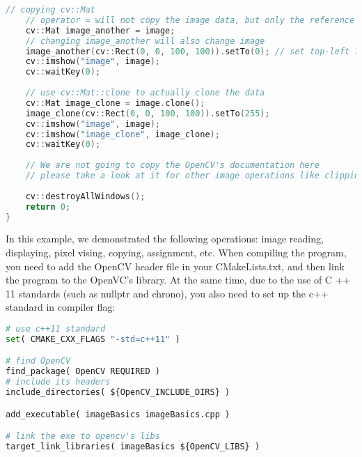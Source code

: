 \begin{lstlisting}[language=C++,caption=slambook/ch5/imageBasics/imageBasics.cpp]
    // copying cv::Mat
    // operator = will not copy the image data, but only the reference
    cv::Mat image_another = image;
    // changing image_another will also change image 
    image_another(cv::Rect(0, 0, 100, 100)).setTo(0); // set top-left 100*100 block to zero
    cv::imshow("image", image);
    cv::waitKey(0);
    
    // use cv::Mat::clone to actually clone the data
    cv::Mat image_clone = image.clone();
    image_clone(cv::Rect(0, 0, 100, 100)).setTo(255);
    cv::imshow("image", image);
    cv::imshow("image_clone", image_clone);
    cv::waitKey(0);
    
    // We are not going to copy the OpenCV's documentation here
    // please take a look at it for other image operations like clipping, rotating and scaling.
    
    cv::destroyAllWindows();
    return 0;
}
\end{lstlisting}

In this example, we demonstrated the following operations: image reading, displaying, pixel vising, copying, assignment, etc. When compiling the program, you need to add the OpenCV header file in your CMakeLists.txt, and then link the program to the OpenVC's library. At the same time, due to the use of C ++ 11 standards (such as nullptr and chrono), you also need to set up the c++ standard in compiler flag:

\begin{lstlisting}[language=Python,caption=slambook/ch5/imageBasics/CMakeLists.txt]
# use c++11 standard
set( CMAKE_CXX_FLAGS "-std=c++11" )

# find OpenCV
find_package( OpenCV REQUIRED )
# include its headers
include_directories( ${OpenCV_INCLUDE_DIRS} )

add_executable( imageBasics imageBasics.cpp )

# link the exe to opencv's libs
target_link_libraries( imageBasics ${OpenCV_LIBS} )
\end{lstlisting}

